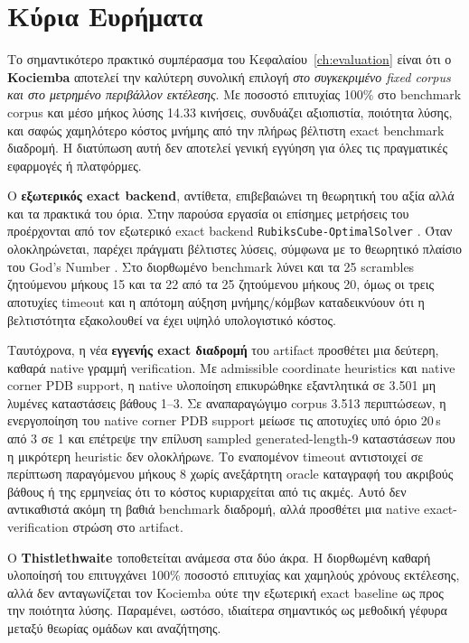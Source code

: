 \section{Κύρια Ευρήματα}

Το σημαντικότερο πρακτικό συμπέρασμα του Κεφαλαίου~\ref{ch:evaluation} είναι
ότι ο \textbf{Kociemba} αποτελεί την καλύτερη συνολική επιλογή \emph{στο
συγκεκριμένο fixed corpus και στο μετρημένο περιβάλλον εκτέλεσης}. Με ποσοστό
επιτυχίας 100\% στο benchmark corpus και μέσο μήκος λύσης 14.33 κινήσεις,
συνδυάζει αξιοπιστία, ποιότητα λύσης, και σαφώς χαμηλότερο κόστος μνήμης από
την πλήρως βέλτιστη exact benchmark διαδρομή. Η διατύπωση αυτή δεν αποτελεί
γενική εγγύηση για όλες τις πραγματικές εφαρμογές ή πλατφόρμες.

Ο \textbf{εξωτερικός exact backend}, αντίθετα, επιβεβαιώνει τη θεωρητική του αξία αλλά και τα
πρακτικά του όρια. Στην παρούσα εργασία οι επίσημες μετρήσεις του
προέρχονται από τον εξωτερικό exact backend \texttt{RubiksCube-OptimalSolver}
\cite{kociemba_rubiks_optimal}. Όταν ολοκληρώνεται, παρέχει πράγματι
βέλτιστες λύσεις, σύμφωνα με το θεωρητικό πλαίσιο του God's Number
\cite{rokicki2010gods}. Στο διορθωμένο benchmark λύνει και τα 25 scrambles
ζητούμενου μήκους 15 και τα 22 από τα 25 ζητούμενου μήκους 20, όμως οι τρεις αποτυχίες timeout και
η απότομη αύξηση μνήμης/κόμβων καταδεικνύουν ότι η βελτιστότητα εξακολουθεί να
έχει υψηλό υπολογιστικό κόστος.

Ταυτόχρονα, η νέα \textbf{εγγενής exact διαδρομή} του artifact προσθέτει μια
δεύτερη, καθαρά native γραμμή verification. Με admissible coordinate
heuristics και native corner PDB support, η native υλοποίηση επικυρώθηκε
εξαντλητικά σε 3.501 μη λυμένες καταστάσεις βάθους 1--3. Σε αναπαραγώγιμο
corpus 3.513 περιπτώσεων, η ενεργοποίηση του native corner PDB support μείωσε τις αποτυχίες
υπό όριο 20\,s από 3 σε 1 και επέτρεψε την επίλυση sampled generated-length-9
καταστάσεων που η μικρότερη heuristic δεν ολοκλήρωνε. Το εναπομένον timeout
αντιστοιχεί σε περίπτωση παραγόμενου μήκους 8 χωρίς ανεξάρτητη oracle
καταγραφή του ακριβούς βάθους ή της ερμηνείας ότι το κόστος κυριαρχείται από
τις ακμές. Αυτό δεν αντικαθιστά ακόμη τη βαθιά benchmark διαδρομή, αλλά
προσθέτει μια native exact-verification στρώση στο artifact.

Ο \textbf{Thistlethwaite} τοποθετείται ανάμεσα στα δύο άκρα. Η διορθωμένη καθαρή
υλοποίησή του επιτυγχάνει 100\% ποσοστό επιτυχίας και χαμηλούς χρόνους εκτέλεσης,
αλλά δεν ανταγωνίζεται τον Kociemba ούτε την εξωτερική exact baseline ως προς την ποιότητα λύσης.
Παραμένει, ωστόσο, ιδιαίτερα σημαντικός ως μεθοδική γέφυρα μεταξύ θεωρίας
ομάδων και αναζήτησης.

